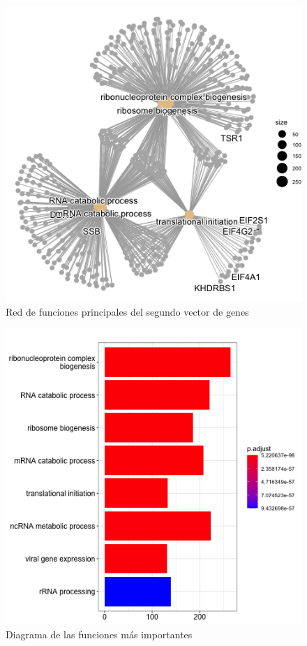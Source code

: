 \begin{figure}[ht!]
	\centering
	\includegraphics[scale = 0.2]{figures/Genes2Funciones.png}
	\caption{Red de funciones principales del segundo vector de genes}
\end{figure}

\begin{figure}[ht!]
	\centering
	\includegraphics[scale = 0.3]{figures/barplotGenes2.png}
	\caption{Diagrama de las funciones m\'as importantes}
\end{figure}
\clearpage

